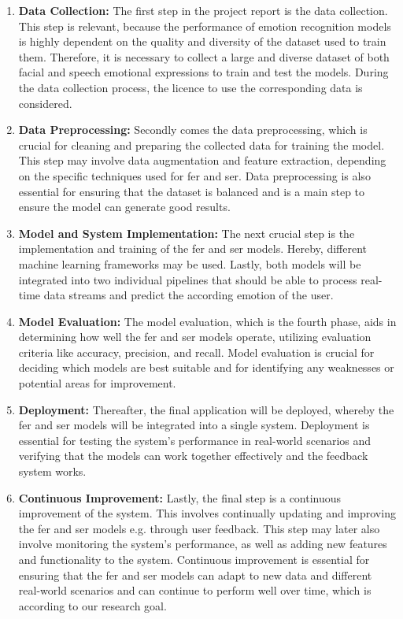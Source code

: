 \begin{enumerate}
    \item \textbf{Data Collection:}
    The first step in the project report is the data collection. This step is relevant, because the performance of emotion recognition models is highly dependent on the quality and diversity of the dataset used to train them. Therefore, it is necessary to collect a large and diverse dataset of both facial and speech emotional expressions to train and test the models. During the data collection process, the licence to use the corresponding data is considered.
    
    \item \textbf{Data Preprocessing:}
    Secondly comes the data preprocessing, which is crucial for cleaning and preparing the collected data for training the model. This step may involve data augmentation and feature extraction, depending on the specific techniques used for \acrshort{fer} and \acrshort{ser}. Data preprocessing is also essential for ensuring that the dataset is balanced and is a main step to ensure the model can generate good results.
    
    \item \textbf{Model and System Implementation:}
    The next crucial step is the implementation and training of the \acrshort{fer} and \acrshort{ser} models. Hereby, different machine learning frameworks may be used. Lastly, both models will be integrated into two individual pipelines that should be able to process real-time data streams and predict the according emotion of the user. 
    
    \item \textbf{Model Evaluation:}
    The model evaluation, which is the fourth phase, aids in determining how well the \acrshort{fer} and \acrshort{ser} models operate, utilizing evaluation criteria like accuracy, precision, and recall. Model evaluation is crucial for deciding which models are best suitable and for identifying any weaknesses or potential areas for improvement.
        
    \item \textbf{Deployment:}
    Thereafter, the final application will be deployed, whereby the \acrshort{fer} and \acrshort{ser} models will be integrated into a single system. Deployment is essential for testing the system's performance in real-world scenarios and verifying that the models can work together effectively and the feedback system works.
    
    \item \textbf{Continuous Improvement:}
    Lastly, the final step is a continuous improvement of the system. This involves continually updating and improving the \acrshort{fer} and \acrshort{ser} models e.g. through user feedback. This step may later also involve monitoring the system's performance, as well as adding new features and functionality to the system. Continuous improvement is essential for ensuring that the \acrshort{fer} and \acrshort{ser} models can adapt to new data and different real-world scenarios and can continue to perform well over time, which is according to our research goal. 
\end{enumerate}

